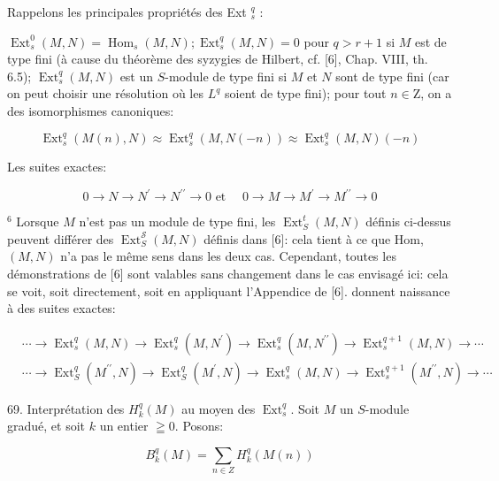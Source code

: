 Rappelons les principales propriétés des Ext $_{s}^{q}$ :

$\operatorname{Ext}_{s}^{0}(M, N)=\operatorname{Hom}_{s}(M, N) ; \operatorname{Ext}_{s}^{q}(M, N)=0$ pour $q>r+1$ si $M$ est $\mathrm{de}$ type fini (à cause du théorème des syzygies de Hilbert, cf. [6], Chap. VIII, th. 6.5); $\operatorname{Ext}_{s}^{q}(M, N)$ est un $S$-module de type fini si $M$ et $N$ sont de type fini (car on peut choisir une résolution où les $L^{q}$ soient de type fini); pour tout $n \in \mathrm{Z}$, on a des isomorphismes canoniques:

$$
\operatorname{Ext}_{s}^{q}(M(n), N) \approx \operatorname{Ext}_{s}^{q}(M, N(-n)) \approx \operatorname{Ext}_{s}^{q}(M, N)(-n)
$$

Les suites exactes:

$$
0 \rightarrow N \rightarrow N^{\prime} \rightarrow N^{\prime \prime} \rightarrow 0 \text { et } \quad 0 \rightarrow M \rightarrow M^{\prime} \rightarrow M^{\prime \prime} \rightarrow 0
$$

${ }^{6}$ Lorsque $M$ n'est pas un module de type fini, les $\operatorname{Ext}_{S}^{t}(M, N)$ définis ci-dessus peuvent différer des $\operatorname{Ext}_{S}^{\mathcal{S}}(M, N)$ définis dans [6]: cela tient à ce que Hom, $(M, N)$ n'a pas le même sens dans les deux cas. Cependant, toutes les démonstrations de [6] sont valables sans changement dans le cas envisagé ici: cela se voit, soit directement, soit en appliquant l'Appendice de [6]. donnent naissance à des suites exactes:

$$
\begin{aligned}
    &\cdots \rightarrow \operatorname{Ext}_{s}^{q}(M, N) \rightarrow \operatorname{Ext}_{s}^{q}\left(M, N^{\prime}\right) \rightarrow \operatorname{Ext}_{s}^{q}\left(M, N^{\prime \prime}\right) \rightarrow \operatorname{Ext}_{s}^{q+1}(M, N) \rightarrow \cdots \\
    &\cdots \rightarrow \operatorname{Ext}_{S}^{q}\left(M^{\prime \prime}, N\right) \rightarrow \operatorname{Ext}_{S}^{q}\left(M^{\prime}, N\right) \rightarrow \operatorname{Ext}_{s}^{q}(M, N) \rightarrow \operatorname{Ext}_{s}^{q+1}\left(M^{\prime \prime}, N\right) \rightarrow \cdots
\end{aligned}
$$

69. Interprétation des $H_{k}^{q}(M)$ au moyen des $\operatorname{Ext}_{s}^{q} .$ Soit $M$ un $S$-module gradué, et soit $k$ un entier $\geqq 0 .$ Posons:

$$
B_{k}^{q}(M)=\sum_{n \in Z} H_{k}^{q}(M(n))
$$

